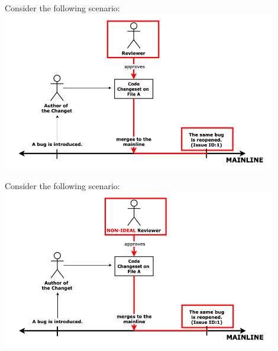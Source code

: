 \documentclass{beamer}
\begin{document}
    \begin{frame}[noframenumbering]{Consider the following scenario:}
    \centering\includegraphics[width=0.9\textwidth]{img/future_mining_3.png}\newline
    \caption{If the same bug is reopened later, it is a potential indicator that the pull request is not conducted properly and the reviewer is not ideal.}
    \end{frame}

    \begin{frame}[noframenumbering]{Consider the following scenario:}
    \centering\includegraphics[width=0.9\textwidth]{img/future_mining_4.png}\newline
    \caption{Removing these instances from the dataset will increase the validity of ground truth.}
    \end{frame}

%    
%     
\end{document}
